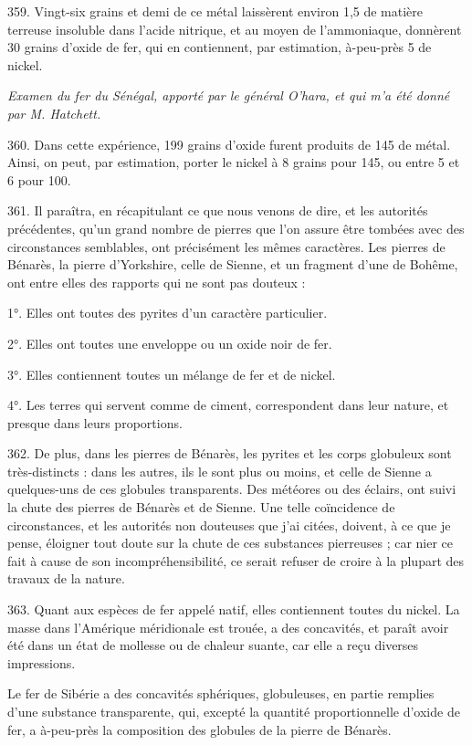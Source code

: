 \documentclass[a4paper, 11pt, oneside, polutonikogreek, french]{article}
\begin{document}
359. Vingt-six grains et demi de ce métal laissèrent environ 1,5 de matière terreuse insoluble dans l'acide nitrique, et au moyen de l'ammoniaque, donnèrent 30 grains d'oxide de fer, qui en contiennent, par estimation, à-peu-près 5 de nickel.

\begin{center}
\emph{Examen du fer du Sénégal, apporté par le général O'hara, et qui m'a été donné par M. Hatchett.}
\end{center}

360. Dans cette expérience, 199 grains d'oxide furent produits de 145 de métal. Ainsi, on peut, par estimation, porter le nickel à 8 grains pour 145, ou entre 5 et 6 pour 100.

361. Il paraîtra, en récapitulant ce que nous venons de dire, et les autorités précédentes, qu'un grand nombre de pierres que l'on assure être tombées avec des circonstances semblables, ont précisément les mêmes caractères. Les pierres de Bénarès, la pierre d'Yorkshire, celle de Sienne, et un fragment d'une de Bohême, ont entre elles des rapports qui ne sont pas douteux :

1°. Elles ont toutes des pyrites d'un caractère particulier.

2°. Elles ont toutes une enveloppe ou un oxide noir de fer.

3°. Elles contiennent toutes un mélange de fer et de nickel.

4°. Les terres qui servent comme de ciment, correspondent dans leur nature, et presque dans leurs proportions.

362. De plus, dans les pierres de Bénarès, les pyrites et les corps globuleux sont très-distincts : dans les autres, ils le sont plus ou moins, et celle de Sienne a quelques-uns de ces globules transparents. Des météores ou des éclairs, ont suivi la chute des pierres de Bénarès et de Sienne. Une telle coïncidence de circonstances, et les autorités non douteuses que j'ai citées, doivent, à ce que je pense, éloigner tout doute sur la chute de ces substances pierreuses ; car nier ce fait à cause de son incompréhensibilité, ce serait refuser de croire à la plupart des travaux de la nature.

363. Quant aux espèces de fer appelé natif, elles contiennent toutes du nickel. La masse dans l'Amérique méridionale est trouée, a des concavités, et paraît avoir été dans un état de mollesse ou de chaleur suante, car elle a reçu diverses impressions.

Le fer de Sibérie a des concavités sphériques, globuleuses, en partie remplies d'une substance transparente, qui, excepté la quantité proportionnelle d'oxide de fer, a à-peu-près la composition des globules de la pierre de Bénarès.
\end{document}
